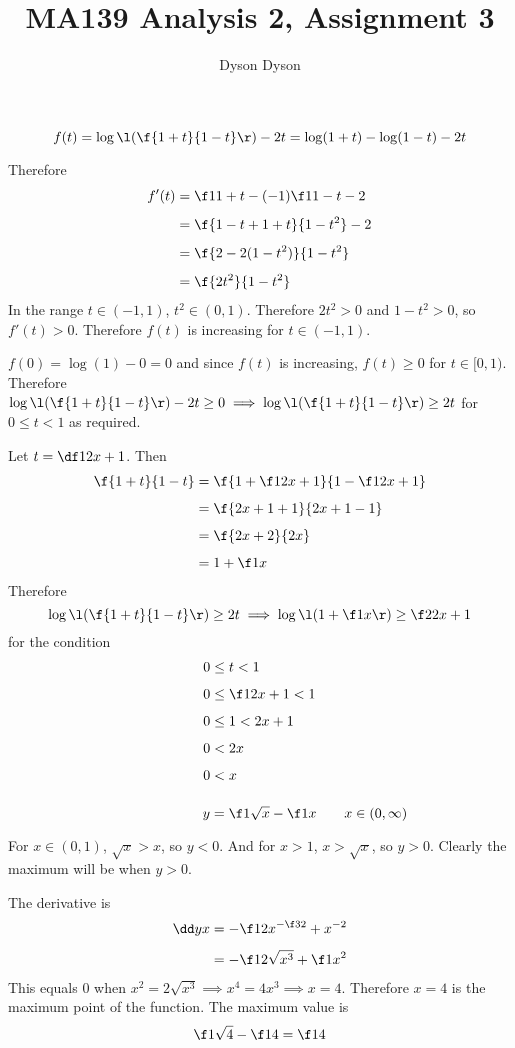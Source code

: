 \documentclass[a4paper]{article}
\title{MA139 Analysis 2, Assignment 3}
\author{Dyson Dyson}
\date{}
\begin{document}
\maketitle

\setlength{\parindent}{0em}
\setlength{\parskip}{1em}


$$f(t) = \log\l( \f{1+t}{1-t} \r) - 2t = \log(1+t) - \log(1-t) - 2t$$

Therefore \begin{align*}
f'(t) &= \f1{1+t} - (-1)\f1{1-t} - 2\\[1ex]
&= \f{1-t + 1+t}{1-t^2} - 2\\[1ex]
&= \f{2 - 2(1-t^2)}{1-t^2}\\[1ex]
&= \f{2t^2}{1-t^2}
\end{align*}
In the range $t \in (-1, 1)$, $t^2 \in (0, 1)$. Therefore $2t^2 > 0$ and $1 - t^2 > 0$, so $f'(t) > 0$. Therefore $f(t)$ is increasing for $t \in (-1, 1)$.

$f(0) = \log(1) - 0 = 0$ and since $f(t)$ is increasing, $f(t) \ge 0$ for $t \in [0, 1)$. Therefore $\log\l( \f{1+t}{1-t} \r) - 2t \ge 0 \implies \log\l( \f{1+t}{1-t} \r) \ge 2t$ for $0 \le t < 1$ as required.

Let $t = \df1{2x+1}$. Then \begin{align*}
\f{1+t}{1-t} &= \f{1 + \f1{2x+1}}{1 - \f1{2x+1}}\\[1ex]
&= \f{2x + 1 + 1}{2x + 1 - 1}\\[1ex]
&= \f{2x + 2}{2x}\\[1ex]
&= 1 + \f1x
\end{align*}
Therefore $$\log\l( \f{1+t}{1-t} \r) \ge 2t \implies \log\l( 1 + \f1x \r) \ge \f2{2x+1}$$
for the condition \begin{align*}
0 &\le t < 1\\[1ex]
0 &\le \f1{2x+1} < 1\\[1ex]
0 &\le 1 < 2x + 1\\[1ex]
0 &< 2x\\[1ex]
0 &< x\\[1ex]
\end{align*}



$$\phantom{\qquad x \in (0, \infty)} y = \f1{\sqrt x} - \f1x \qquad x \in (0, \infty)$$

For $x \in (0,1)$, $\sqrt x > x$, so $y < 0$. And for $x > 1$, $x > \sqrt x$, so $y > 0$. Clearly the maximum will be when $y > 0$.

The derivative is \begin{align*}
\dd yx &= -\f12 x^{-\f32} + x^{-2}\\[1ex]
&= - \f1{2\sqrt{x^3}} + \f1{x^2}
\end{align*}
This equals 0 when $x^2 = 2 \sqrt{x^3} \implies x^4 = 4x^3 \implies x = 4$. Therefore $x = 4$ is the maximum point of the function. The maximum value is $$\f1{\sqrt 4} - \f14 = \f14$$



\end{document}
